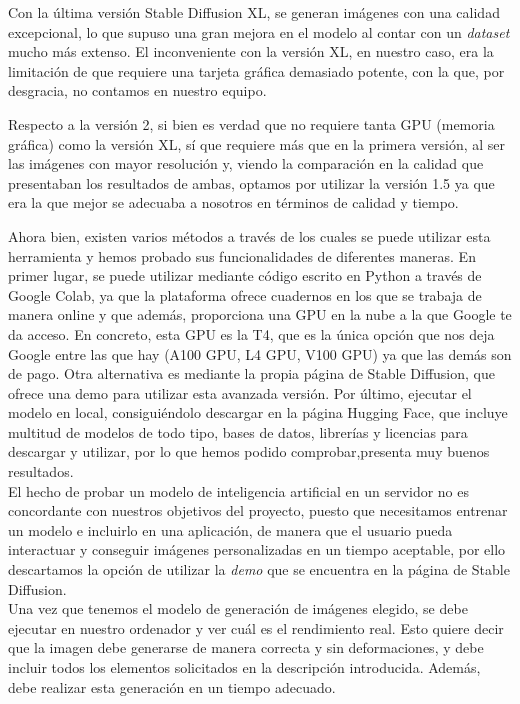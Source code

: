 Con la última versión Stable Diffusion XL, se generan imágenes con una calidad excepcional, lo que supuso una gran mejora en el modelo al contar con un \textit{dataset} mucho más extenso. El inconveniente con la versión XL, en nuestro caso, era la limitación de que requiere una tarjeta gráfica demasiado potente, con la que, por desgracia, no contamos en nuestro equipo. 

Respecto a la versión 2, si bien es verdad que no requiere tanta GPU (memoria gráfica) como la versión XL, sí que requiere más que en la primera versión, al ser las imágenes con mayor resolución y, viendo la comparación en la calidad que presentaban los resultados de ambas, optamos por utilizar la versión 1.5 ya que era la que mejor se adecuaba a nosotros en términos de calidad y tiempo.


Ahora bien, existen varios métodos a través de los cuales se puede utilizar esta herramienta y hemos probado sus funcionalidades de diferentes maneras. En primer lugar, se puede utilizar mediante código escrito en Python a través de Google Colab, ya que la plataforma ofrece cuadernos en los que se trabaja de manera online y que además, proporciona una GPU en la nube a la que Google te da acceso. En concreto, esta GPU es la T4, que es la única opción que nos deja Google entre las que hay (A100 GPU, L4 GPU, V100 GPU) ya que las demás son de pago. Otra alternativa es mediante la propia página de Stable Diffusion, que ofrece una demo para utilizar esta avanzada versión. Por último, ejecutar el modelo en local, consiguiéndolo descargar en la página Hugging Face, que incluye multitud de modelos de todo tipo, bases de datos, librerías y licencias para descargar y utilizar, por lo que hemos podido comprobar,presenta muy buenos resultados.\\

El hecho de probar un modelo de inteligencia artificial en un servidor no es concordante con nuestros objetivos del proyecto, puesto que necesitamos entrenar un modelo e incluirlo en una aplicación, de manera que el usuario pueda interactuar y conseguir imágenes personalizadas en un tiempo aceptable, por ello descartamos la opción de utilizar la \textit{demo} que se encuentra en la página de Stable Diffusion. \\

Una vez que tenemos el modelo de generación de imágenes elegido, se debe ejecutar en nuestro ordenador y ver cuál es el rendimiento real. Esto quiere decir que la imagen debe generarse de manera correcta y sin deformaciones, y debe incluir todos los elementos solicitados en la descripción introducida. Además, debe realizar esta generación en un tiempo adecuado.\\

